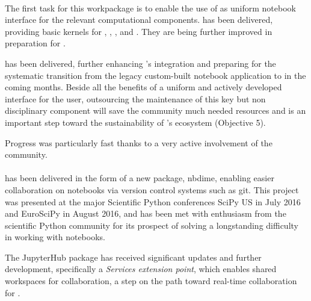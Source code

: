 \documentclass{deliverablereport}
\begin{document}

\paragraph{}
\label{UI@ipython-kernels}
The first task for this workpackage is to enable the use of \Jupyter
as uniform notebook interface for the relevant computational
components.  has been delivered,
providing basic \Jupyter kernels for \GAP, \Pari, \Sage, and
\Singular. They are being further improved in preparation for
.

 has been delivered, further
enhancing \Sage's \Jupyter integration and preparing for the
systematic transition from the legacy custom-built \Sage notebook
application to \Jupyter in the coming months. Beside all the benefits
of a uniform and actively developed interface for the user,
outsourcing the maintenance of this key but non disciplinary component
will save the \Sage community much needed resources and is an
important step toward the sustainability of \ODK's ecosystem
(Objective 5).

Progress was particularly fast thanks to a very active involvement of
the \Sage community.



\paragraph{}

 has been delivered in the form of a new \Jupyter package, nbdime,
enabling easier collaboration on notebooks via version control systems such as git. This project
was presented at the major Scientific Python conferences SciPy US in July 2016 and EuroSciPy in August 2016,
and has been met with enthusiasm from the scientific Python community for its prospect of solving a
longstanding difficulty in working with notebooks.

The JupyterHub package has received significant updates and further development, specifically a
\emph{Services extension point}, which enables shared workspaces for collaboration, a step on the path
toward real-time collaboration for .

\paragraph{}
\end{document}
